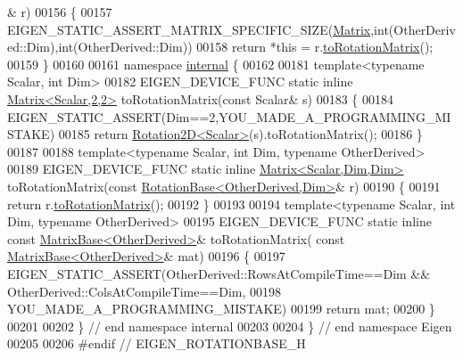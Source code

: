\begin{DoxyCode}
      & r)
00156 \{
00157   EIGEN\_STATIC\_ASSERT\_MATRIX\_SPECIFIC\_SIZE(\hyperlink{group___core___module_class_eigen_1_1_matrix}{Matrix},\textcolor{keywordtype}{int}(OtherDerived::Dim),\textcolor{keywordtype}{int}(OtherDerived::Dim))
00158   \textcolor{keywordflow}{return} *\textcolor{keyword}{this} = r.\hyperlink{class_eigen_1_1_rotation_base_aac726e89402a427c605514ce31b01e42}{toRotationMatrix}();
00159 \}
00160 
00161 \textcolor{keyword}{namespace }\hyperlink{namespaceinternal}{internal} \{
00162 
00181 \textcolor{keyword}{template}<\textcolor{keyword}{typename} Scalar, \textcolor{keywordtype}{int} Dim>
00182 EIGEN\_DEVICE\_FUNC \textcolor{keyword}{static} \textcolor{keyword}{inline} \hyperlink{group___core___module_class_eigen_1_1_matrix}{Matrix<Scalar,2,2>} toRotationMatrix(\textcolor{keyword}{const} Scalar& s)
00183 \{
00184   EIGEN\_STATIC\_ASSERT(Dim==2,YOU\_MADE\_A\_PROGRAMMING\_MISTAKE)
00185   \textcolor{keywordflow}{return} \hyperlink{group___geometry___module_class_eigen_1_1_rotation2_d}{Rotation2D<Scalar>}(s).toRotationMatrix();
00186 \}
00187 
00188 \textcolor{keyword}{template}<\textcolor{keyword}{typename} Scalar, \textcolor{keywordtype}{int} Dim, \textcolor{keyword}{typename} OtherDerived>
00189 EIGEN\_DEVICE\_FUNC \textcolor{keyword}{static} \textcolor{keyword}{inline} \hyperlink{group___core___module_class_eigen_1_1_matrix}{Matrix<Scalar,Dim,Dim>} toRotationMatrix(\textcolor{keyword}{const} 
      \hyperlink{class_eigen_1_1_rotation_base}{RotationBase<OtherDerived,Dim>}& r)
00190 \{
00191   \textcolor{keywordflow}{return} r.\hyperlink{class_eigen_1_1_rotation_base_aac726e89402a427c605514ce31b01e42}{toRotationMatrix}();
00192 \}
00193 
00194 \textcolor{keyword}{template}<\textcolor{keyword}{typename} Scalar, \textcolor{keywordtype}{int} Dim, \textcolor{keyword}{typename} OtherDerived>
00195 EIGEN\_DEVICE\_FUNC \textcolor{keyword}{static} \textcolor{keyword}{inline} \textcolor{keyword}{const} \hyperlink{group___core___module_class_eigen_1_1_matrix_base}{MatrixBase<OtherDerived>}& toRotationMatrix(\textcolor{keyword}{
      const} \hyperlink{group___core___module_class_eigen_1_1_matrix_base}{MatrixBase<OtherDerived>}& mat)
00196 \{
00197   EIGEN\_STATIC\_ASSERT(OtherDerived::RowsAtCompileTime==Dim && OtherDerived::ColsAtCompileTime==Dim,
00198     YOU\_MADE\_A\_PROGRAMMING\_MISTAKE)
00199   \textcolor{keywordflow}{return} mat;
00200 \}
00201 
00202 \} \textcolor{comment}{// end namespace internal}
00203 
00204 \} \textcolor{comment}{// end namespace Eigen}
00205 
00206 \textcolor{preprocessor}{#endif // EIGEN\_ROTATIONBASE\_H}
\end{DoxyCode}

